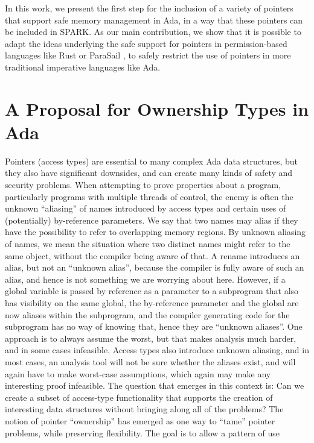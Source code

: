 \documentclass{llncs}
\begin{document}
In this work, we present the first step for the inclusion of a variety of pointers that support safe memory management in Ada, in a way that these pointers can be included in SPARK. As our main contribution, we show that it is possible to adapt the ideas underlying the safe support for pointers in permission-based languages like Rust \cite{Balasubramanian17} or ParaSail , to safely restrict the use of pointers in more traditional imperative languages like Ada. 



\section{A Proposal for Ownership Types in Ada}
Pointers (access types) are essential to many complex Ada data structures, but they also have significant downsides, and can create many kinds of safety and security problems.
When attempting to prove properties about a program, particularly programs with multiple threads of control, the enemy is often the unknown ``aliasing'' of names introduced by
access types and certain uses of (potentially) by-reference parameters. We say that two names may alias if they have the possibility to refer to overlapping memory regions.
By unknown aliasing of names, we mean the situation where two distinct names might refer to the same object, without the compiler being aware of that.  A rename introduces
an alias, but not an ``unknown alias'', because the compiler is fully aware of such an alias, and hence is not something we are worrying about here. However, if a global
variable is passed by reference as a parameter to a subprogram that also has visibility on the same global, the by-reference parameter and the global are now aliases within
the subprogram, and the compiler generating code for the subprogram has no way of knowing that, hence they are ``unknown aliases''.  One approach is to always assume the worst,
but that makes analysis  much harder, and in some cases infeasible. Access types also introduce unknown aliasing, and in most cases, an analysis tool will not be
sure whether the aliases exist, and will again have to make worst-case assumptions, which again may make any interesting proof infeasible.
The question that emerges in this context is: Can we create a subset of access-type functionality that supports the creation of interesting data structures without bringing along
all of the problems? The notion of pointer ``ownership'' has emerged as one way to ``tame'' pointer problems, while preserving flexibility.  The goal is to allow a pattern of use
\end{document}
